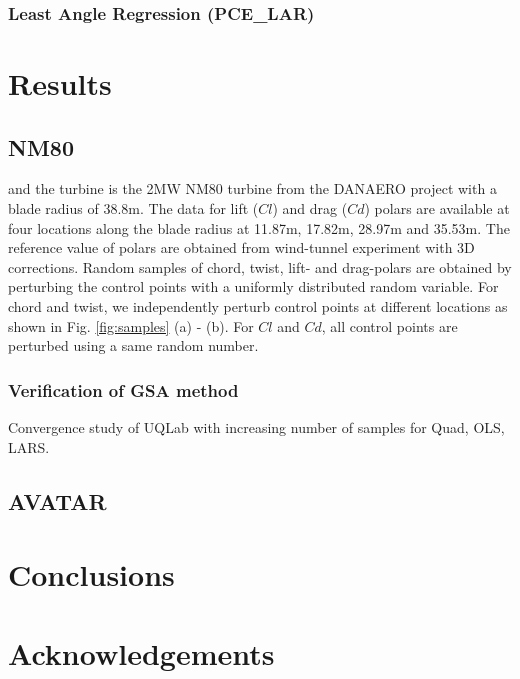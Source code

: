 \documentclass[review]{elsarticle}
\numberwithin{equation}{section}
\newcommand{\myreferences}{../references,../Mendeley_refs}
\numberwithin{equation}{section}
\begin{document}
\subsubsection{Least Angle Regression (PCE\_LAR)}
\section{Results}\label{sec:results}

\subsection{NM80}
 and the turbine is the 2MW NM80 turbine from the DANAERO project \cite{Troldborg2013} with a blade radius of 38.8m. The data for lift ($Cl$) and drag ($Cd$) polars are available at four locations along the blade radius at 11.87m, 17.82m, 28.97m and 35.53m. The reference value of polars are obtained from wind-tunnel experiment with 3D corrections. Random samples of chord, twist, lift- and drag-polars are obtained by perturbing the control points with a uniformly distributed random variable. For chord and twist, we independently perturb control points at different locations as shown in Fig. \ref{fig:samples} (a) - (b). For $Cl$ and $Cd$, all control points are perturbed using a same random number.
 
\subsubsection{Verification of GSA method}
Convergence study of UQLab with increasing number of samples for Quad, OLS, LARS.

\subsection{AVATAR}

\section{Conclusions}\label{sec:conclusions}

\section*{Acknowledgements}

\newpage


\newpage

\appendix

\end{document}

